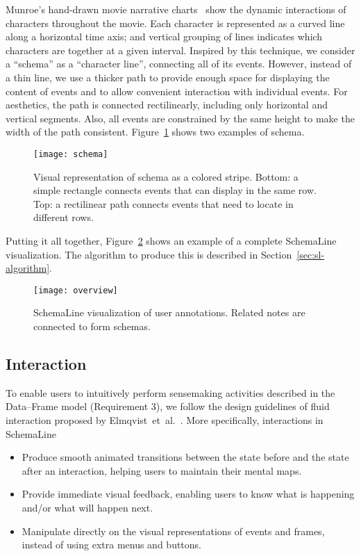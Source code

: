 Munroe's hand-drawn movie narrative charts~\cite{Munroe2009} show the dynamic interactions of characters throughout the movie. Each character is represented as a curved line along a horizontal time axis; and vertical grouping of lines indicates which characters are together at a given interval. Inspired by this technique, we consider a ``schema'' as a ``character line'', connecting all of its events. However, instead of a thin line, we use a thicker path to provide enough space for displaying the content of events and to allow convenient interaction with individual events. For aesthetics, the path is connected rectilinearly, including only horizontal and vertical segments. Also,  all events are constrained by the same height to make the width of the path consistent. Figure~\ref{fig:schema} shows two examples of schema. 

\begin{figure}[!htb]
	\centering
	\texttt{[image: schema]}
	\caption{Visual representation of schema as a colored stripe. Bottom: a simple rectangle connects events that can display in the same row. Top: a rectilinear path connects events that need to locate in different rows.}
	\label{fig:schema}
\end{figure}

Putting it all together, Figure~\ref{fig:sl-overview} shows an example of a complete SchemaLine visualization. The algorithm to produce this is described in Section~\ref{sec:sl-algorithm}.

\begin{figure}[!htb]
	\centering
	\texttt{[image: overview]}
	\caption{SchemaLine visualization of user annotations. Related notes are connected to form schemas.}
	\label{fig:sl-overview}
\end{figure}

\subsection{Interaction}
To enable users to intuitively perform sensemaking activities described in the Data--Frame model (Requirement 3), we follow the design guidelines of fluid interaction proposed by Elmqvist~et~al.~\cite{Elmqvist2011}. More specifically, interactions in SchemaLine 
\begin{itemize}
	\item Produce smooth animated transitions between the state before and the state after an interaction, helping users to maintain their mental maps.
	\item Provide immediate visual feedback, enabling users to know what is happening and/or what will happen next.
	\item Manipulate directly on the visual representations of events and frames, instead of using extra menus and buttons.
\end{itemize}

